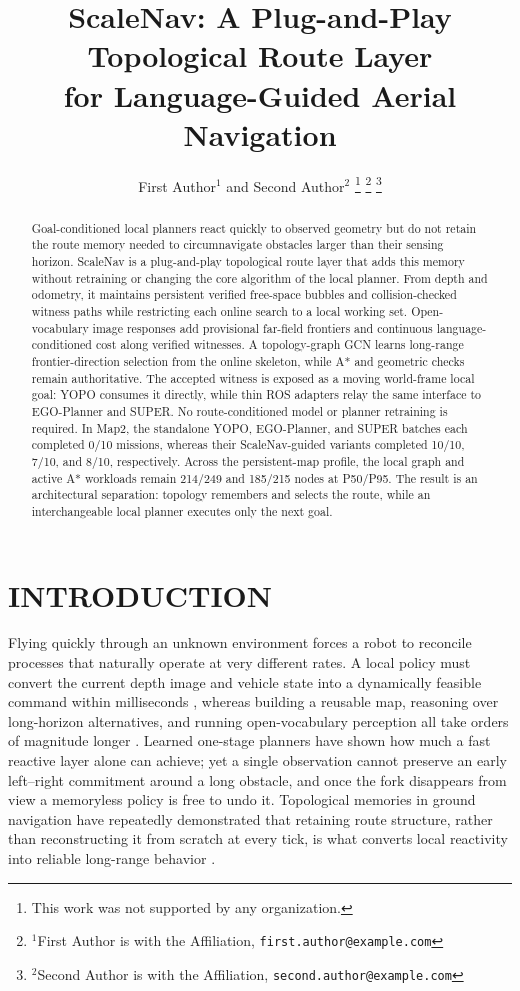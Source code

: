 \documentclass[letterpaper,10pt,conference]{ieeeconf}
\title{\LARGE \bf
ScaleNav: A Plug-and-Play Topological Route Layer\\
for Language-Guided Aerial Navigation
}
\author{First Author$^{1}$ and Second Author$^{2}$%
\thanks{This work was not supported by any organization.}%
\thanks{$^{1}$First Author is with the Affiliation,
        {\tt\small first.author@example.com}}%
\thanks{$^{2}$Second Author is with the Affiliation,
        {\tt\small second.author@example.com}}%
}
\begin{document}
\maketitle
\thispagestyle{empty}
\pagestyle{empty}

\begin{abstract}
Goal-conditioned local planners react quickly to observed geometry but do not
retain the route memory needed to circumnavigate obstacles larger than their
sensing horizon.  ScaleNav is a plug-and-play topological route layer that
adds this memory without retraining or changing the core algorithm of the
local planner.  From depth and odometry, it maintains persistent verified
free-space bubbles and collision-checked witness paths while restricting each
online search to a local working set.  Open-vocabulary image responses add
provisional far-field frontiers and continuous language-conditioned cost along
verified witnesses.  A topology-graph GCN learns long-range frontier-direction
selection from the online skeleton, while A* and geometric checks remain
authoritative.  The accepted witness is exposed as a
moving world-frame local goal: YOPO consumes it directly, while thin ROS
adapters relay the same interface to EGO-Planner and SUPER.  No
route-conditioned model or planner retraining is required.  In Map2, the
standalone YOPO, EGO-Planner, and SUPER batches each completed 0/10
missions, whereas their ScaleNav-guided variants completed 10/10, 7/10, and
8/10, respectively.  Across the persistent-map profile, the local graph and
active A* workloads remain 214/249 and 185/215 nodes at P50/P95.  The result
is an architectural separation: topology remembers and selects the route,
while an interchangeable local planner executes only the next goal.
\end{abstract}

\section{INTRODUCTION}
Flying quickly through an unknown environment forces a robot to reconcile
processes that naturally operate at very different rates.  A local policy must
convert the current depth image and vehicle state into a dynamically feasible
command within milliseconds
\cite{rappids,nanomap,egoplanner,yopo,loquercio}, whereas building a reusable
map, reasoning over long-horizon alternatives, and running open-vocabulary
perception all take orders of magnitude longer
\cite{voxblox,clip}.  Learned one-stage planners
\cite{yopo,loquercio} have shown
how much a fast reactive layer alone can achieve; yet a single observation
cannot preserve an early left--right commitment around a long obstacle, and
once the fork disappears from view a memoryless policy is free to undo it.
Topological memories in ground navigation have repeatedly demonstrated that
retaining route structure, rather than reconstructing it from scratch at every
tick, is what converts local reactivity into reliable long-range behavior
\cite{sptm,ving}.
\end{document}
